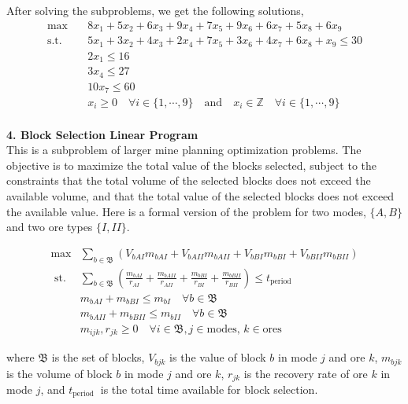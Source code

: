 \documentclass[11pt]{article}
\begin{document}
\noindent After solving the subproblems, we get the following solutions,\\

\begin{align}
\text{max} & \quad 8 x_1+5 x_2+6 x_3+9 x_4+7 x_5+9 x_6+6 x_7+5 x_8  + 6 x_9 \nonumber \\ 
\text{s.t.} & \quad 5 x_1+ 3 x_2+4 x_3+2 x_4+7 x_5+3 x_6+4 x_7+6 x_8 + x_9 \leq 30 \nonumber \\
&\quad 2 x_1 \leq 16\nonumber\\ 
& \quad  3 x_4 \leq 27 \nonumber\\
& \quad  10 x_7 \leq 60 \nonumber\\
& \quad x_i \geq 0 \quad \forall i \in \{1, \cdots,9\} \quad \text{and} \quad x_i \in \mathbb{Z} \quad \forall i \in \{1, \cdots,9\} \nonumber
\end{align} \nonumber
\\

\noindent \textbf{\large{4. Block Selection Linear Program}} \\

\noindent This is a subproblem of larger mine planning optimization problems. The objective is to maximize the total value of the blocks selected, subject to the constraints that the total volume of the selected blocks does not exceed the available volume, and that the total value of the selected blocks does not exceed the available value. Here is a formal version of the problem for two modes, $\{A, B\}$ and two ore types $\{I, II\}$.

\begin{align} 
    \max & \sum_{b \in \mathfrak{B}}\left(V_{b A I} m_{b A I}+V_{b A I I} m_{b A II}+V_{b B I} m_{b B I}+V_{b B II} m_{b B II}\right) \\ 
    \text { st. } & \sum_{b \in \mathfrak{B}}\left(\frac{m_{b A I}}{r_{A I}}+\frac{m_{b A II}}{r_{A II}}+\frac{m_{b B I}}{r_{B I}}+\frac{m_{b B II}}{r_{B II}}\right) \leqslant t_{\text {period }} \\ 
    & m_{b A I}+m_{b B I} \leqslant m_{b I} \quad \forall b \in \mathfrak{B} \\ 
    & m_{b A II}+m_{b B II} \leqslant m_{b II} \quad \forall b \in \mathfrak{B} \\ 
    & m_{i j k}, r_{j k} \geqslant 0 \quad \forall i \in \mathfrak{B}, j \in \text {modes, } k \in \text {ores }
\end{align}

\noindent where $\mathfrak{B}$ is the set of blocks, $V_{b j k}$ is the value of block $b$ in mode $j$ and ore $k$, $m_{b j k}$ is the volume of block $b$ in mode $j$ and ore $k$, $r_{j k}$ is the recovery rate of ore $k$ in mode $j$, and $t_{\text {period }}$ is the total time available for block selection.\\
\end{document}
